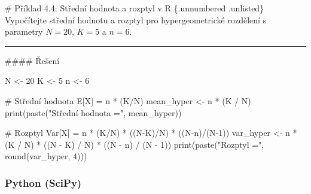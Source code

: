 \documentclass[
  czech,
  11pt,
  letterpaper,
  DIV=11,
  numbers=noendperiod]{scrreprt}
\newenvironment{Shaded}{\begin{snugshade}}{\end{snugshade}}
\newcommand{\CommentTok}[1]{\textcolor[rgb]{0.37,0.37,0.37}{#1}}
\newcommand{\DecValTok}[1]{\textcolor[rgb]{0.68,0.00,0.00}{#1}}
\newcommand{\FunctionTok}[1]{\textcolor[rgb]{0.28,0.35,0.67}{#1}}
\newcommand{\NormalTok}[1]{\textcolor[rgb]{0.00,0.23,0.31}{#1}}
\newcommand{\OtherTok}[1]{\textcolor[rgb]{0.00,0.23,0.31}{#1}}
\newcommand{\SpecialCharTok}[1]{\textcolor[rgb]{0.37,0.37,0.37}{#1}}
\newcommand{\StringTok}[1]{\textcolor[rgb]{0.13,0.47,0.30}{#1}}
\begin{document}
\begin{tcolorbox}[enhanced jigsaw, arc=.35mm, bottomrule=.15mm, bottomtitle=1mm, breakable, colback=white, colbacktitle=quarto-callout-note-color!10!white, colframe=quarto-callout-note-color-frame, coltitle=black, left=2mm, leftrule=.75mm, opacityback=0, opacitybacktitle=0.6, rightrule=.15mm, title=\textcolor{quarto-callout-note-color}{\faInfo}\hspace{0.5em}{Poznámka}, titlerule=0mm, toprule=.15mm, toptitle=1mm]

\# Příklad 4.4: Střední hodnota a rozptyl v R \{.unnumbered .unlisted\}
Vypočítejte střední hodnotu a rozptyl pro hypergeometrické rozdělení s
parametry \(N=20\), \(K=5\) a \(n=6\).

\begin{center}\rule{0.5\linewidth}{0.5pt}\end{center}

\#\#\#\# Řešení

\begin{Shaded}
\begin{Highlighting}[]
\NormalTok{N }\OtherTok{\textless{}{-}} \DecValTok{20}
\NormalTok{K }\OtherTok{\textless{}{-}} \DecValTok{5}
\NormalTok{n }\OtherTok{\textless{}{-}} \DecValTok{6}

\CommentTok{\# Střední hodnota E[X] = n * (K/N)}
\NormalTok{mean\_hyper }\OtherTok{\textless{}{-}}\NormalTok{ n }\SpecialCharTok{*}\NormalTok{ (K }\SpecialCharTok{/}\NormalTok{ N)}
\FunctionTok{print}\NormalTok{(}\FunctionTok{paste}\NormalTok{(}\StringTok{"Střední hodnota ="}\NormalTok{, mean\_hyper))}

\CommentTok{\# Rozptyl Var[X] = n * (K/N) * ((N{-}K)/N) * ((N{-}n)/(N{-}1))}
\NormalTok{var\_hyper }\OtherTok{\textless{}{-}}\NormalTok{ n }\SpecialCharTok{*}\NormalTok{ (K }\SpecialCharTok{/}\NormalTok{ N) }\SpecialCharTok{*}\NormalTok{ ((N }\SpecialCharTok{{-}}\NormalTok{ K) }\SpecialCharTok{/}\NormalTok{ N) }\SpecialCharTok{*}\NormalTok{ ((N }\SpecialCharTok{{-}}\NormalTok{ n) }\SpecialCharTok{/}\NormalTok{ (N }\SpecialCharTok{{-}} \DecValTok{1}\NormalTok{))}
\FunctionTok{print}\NormalTok{(}\FunctionTok{paste}\NormalTok{(}\StringTok{"Rozptyl ="}\NormalTok{, }\FunctionTok{round}\NormalTok{(var\_hyper, }\DecValTok{4}\NormalTok{)))}
\end{Highlighting}
\end{Shaded}

\end{tcolorbox}

\subsubsection*{Python (SciPy)}\label{python-scipy-3}
\end{document}
